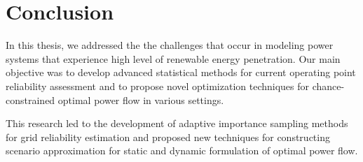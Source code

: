 \chapter*{Conclusion}




In this thesis, we addressed the the challenges that occur in modeling power systems that experience high level of renewable energy penetration. Our main objective was to develop advanced statistical methods for current operating point reliability assessment and to propose novel optimization techniques for chance-constrained optimal power flow in various settings.



This research led to the development of adaptive importance sampling methods for grid reliability estimation and proposed new techniques for constructing scenario approximation for static and dynamic formulation of optimal power flow.


